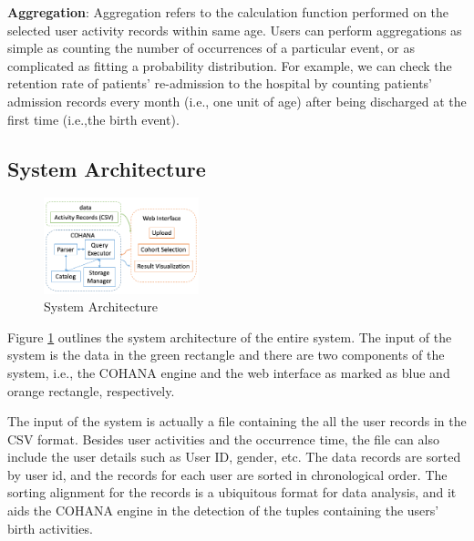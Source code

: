 \documentclass[10pt,conference,letterpaper]{IEEEtran}
\begin{document}
\textbf{Aggregation}: Aggregation refers to the calculation function performed on the selected user activity records within same age. Users can perform aggregations as simple as counting the number of occurrences of a particular event, or as complicated as fitting a probability distribution. For example, we can check the retention rate of patients' re-admission to the hospital by counting patients' admission records every month (i.e., one unit of age) after being discharged at the first time (i.e.,the birth event).

\subsection{System Architecture}

\begin{figure}
    \centering
    \includegraphics[width=0.4\textwidth]{arch.png}
    \caption{System Architecture}
    \label{fig:sys_arch}
\end{figure}

Figure \ref{fig:sys_arch} outlines the system architecture of the entire system. The input of the system is the data in the green rectangle and there are two components of the system, i.e., the COHANA engine and the web interface as marked as blue and orange rectangle, respectively. 

The input of the system is actually a file containing the all the user records in the CSV format. 
Besides user activities and the occurrence time, the file can also 
include the user details such as User ID, gender, etc. 
The data records are sorted by user id, and the records for each user are sorted in chronological order. 
The sorting alignment for the records is a ubiquitous format for data analysis, and it aids the COHANA engine in the detection of the tuples containing the users' birth activities.
\end{document}
